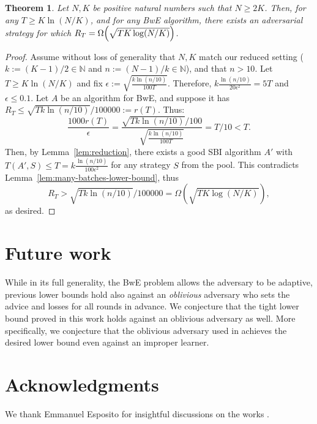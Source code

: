 \documentclass[a4paper,11pt]{article}
\newtheorem{theorem}{Theorem}[section]
\theoremstyle{definition}
\begin{document}
\begin{theorem} \label{thm:main}
    Let $N,K$ be positive natural numbers such that $N \geq 2K$. Then, for any $T \geq K \ln (N/K) $, and for any BwE algorithm, there exists an adversarial strategy for which $R_T = \Omega \mleft(\sqrt{TK \log (N/K)} \mright)$.
\end{theorem}

\begin{proof}
    Assume without loss of generality that $N,K$ match our reduced setting ($k:= (K-1)/2 \in \mathbb{N}$ and $n:= (N-1)/k \in \mathbb{N}$), and that $n > 10$.
    Let $T \geq K \ln (N/K)$ and  fix $\epsilon :=  \sqrt{\frac{k \ln (n/10)}{100T}} $. Therefore, $k \frac{\ln(n/10)}{20 \epsilon^2} = 5T$ and $\epsilon \leq 0.1$. Let $A$ be an algorithm for BwE, and suppose it has $R_T \leq \sqrt{T k \ln (n/10)}/100000 := r(T)$. Thus:
    \[
    \frac{1000 r(T)}{\epsilon} = \frac{\sqrt{T k \ln (n/10)}/100 }{\sqrt{\frac{k \ln (n/10)}{100T}}} = T/10 < T.
    \]
    Then, by Lemma~\ref{lem:reduction}, there exists a good SBI algorithm $A'$ with $T(A',S) \leq T = k \frac{\ln(n/10)}{100 \epsilon^2}$ for any strategy $S$ from the pool. This contradicts Lemma~\ref{lem:many-batches-lower-bound}, thus
    \[
     R_T > \sqrt{T k \ln (n/10)}/100000 = \Omega(\sqrt{TK \log (N/K)}),
    \]
    as desired.
\end{proof}

\section{Future work} \label{sec:future}
While in its full generality, the BwE problem allows the adversary to be adaptive, previous lower bounds hold also against an \emph{oblivious} adversary who sets the advice and losses for all rounds in advance. We conjecture that the tight lower bound proved in this work holds against an oblivious adversary as well. More specifically, we conjecture that the oblivious adversary used in \cite{ito2024minimax} achieves the desired lower bound even against an improper learner.

\section*{Acknowledgments}
We thank Emmanuel Esposito for insightful discussions on the works \cite{cesa2025improved, ito2024minimax}.



\end{document}

